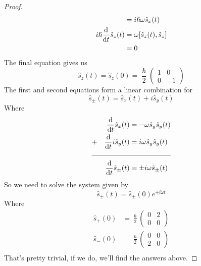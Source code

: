 \documentclass[a4paper]{article}
\begin{document}
\begin{enumerate}
\begin{ans}
\begin{proof}
\begin{align*}
				&=i\hslash\omega\hat{s}_x(t)\\
			i\hslash\frac{\mathrm{d} }{\mathrm{d} t}\hat{s}_z(t) &= \omega
				[\hat{s}_z(t),\hat{s}_z]\\ &= 0
		\end{align*}
		The final equation gives us
		\[ 
			\hat{s}_z(t) = \hat{s}_z(0) = \frac{\hslash}{2}
			\begin{pmatrix} 1 & 0 \\ 0 & -1 \end{pmatrix}
		\]
		The first and second equations form a linear combination
		for
		\[ \hat{s}_{\pm}(t) = \hat{s}_x(t)+i\hat{s}_y(t) \]
		Where
		\begin{align*}
			&&\der{}{t}\hat{s}_x(t)&=-\omega\hat{s}_y\hat{s}_y(t)\\
			&+&
			\der{}{t}i\hat{s}_y(t)&=i\omega\hat{s}_y\hat{s}_y(t)\\
			\cmidrule{1-4}
			&&\der{}{t}\hat{s}_{\pm}(t)&=\pm i\omega\hat{s}_\pm(t)
		\end{align*}
		So we need to solve the system given by
		\[ \hat{s}_{\pm}(t) = \hat{s}_{\pm}(0)e^{\pm i\omega t} \]
		Where
		\begin{align*}
			\hat{s}_+(0) &= \frac{\hslash}{2}
			\begin{pmatrix}
				0 & 2 \\ 0 & 0
			\end{pmatrix}\\
			\hat{s}_-(0) &= \frac{\hslash}{2}
			\begin{pmatrix}
				0 & 0 \\ 2 & 0
			\end{pmatrix}\\
		\end{align*}
		That's pretty trivial, if we do, we'll find the answers above.
	\end{proof}
	\end{ans}
\end{enumerate}
\end{document}
